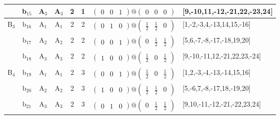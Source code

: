 \documentclass[fleqn,10pt,landscape]{article}
\begin{document}
\begin{itemize}
\begin{center}
\begin{longtable}{cc|cc|c|c|c|l}
& b$_{15}$ & A$_{3}$ & A$_{3}$ & 2 & 1 & $\begin{pmatrix} 0 & 0 & 1 \end{pmatrix}@\begin{pmatrix} 0 & 0 & 0 \end{pmatrix}$ & [9,-10,11,-12,-21,22,-23,24] \\ \hline
B$_{3}$ & b$_{16}$ & A$_{1}$ & A$_{1}$ & 2 & 2 & $\begin{pmatrix} 0 & 1 & 0 \end{pmatrix}@\begin{pmatrix} \frac{1}{2} & \frac{1}{2} & 0 \end{pmatrix}$ & [1,-2,-3,4,-13,14,15,-16] \\
& b$_{17}$ & A$_{2}$ & A$_{2}$ & 2 & 2 & $\begin{pmatrix} 0 & 0 & 1 \end{pmatrix}@\begin{pmatrix} 0 & \frac{1}{2} & \frac{1}{2} \end{pmatrix}$ & [5,6,-7,-8,-17,-18,19,20] \\
& b$_{18}$ & A$_{3}$ & A$_{3}$ & 2 & 2 & $\begin{pmatrix} 1 & 0 & 0 \end{pmatrix}@\begin{pmatrix} \frac{1}{2} & 0 & \frac{1}{2} \end{pmatrix}$ & [9,-10,-11,12,-21,22,23,-24] \\ \hline
B$_{4}$ & b$_{19}$ & A$_{1}$ & A$_{1}$ & 2 & 3 & $\begin{pmatrix} 0 & 0 & 1 \end{pmatrix}@\begin{pmatrix} \frac{1}{2} & 0 & \frac{1}{2} \end{pmatrix}$ & [1,2,-3,-4,-13,-14,15,16] \\
& b$_{20}$ & A$_{2}$ & A$_{2}$ & 2 & 3 & $\begin{pmatrix} 1 & 0 & 0 \end{pmatrix}@\begin{pmatrix} \frac{1}{2} & \frac{1}{2} & 0 \end{pmatrix}$ & [5,-6,7,-8,-17,18,-19,20] \\
& b$_{21}$ & A$_{3}$ & A$_{3}$ & 2 & 3 & $\begin{pmatrix} 0 & 1 & 0 \end{pmatrix}@\begin{pmatrix} 0 & \frac{1}{2} & \frac{1}{2} \end{pmatrix}$ & [9,10,-11,-12,-21,-22,23,24] \\
\end{longtable}
\end{center}


\end{itemize}
\end{document}
